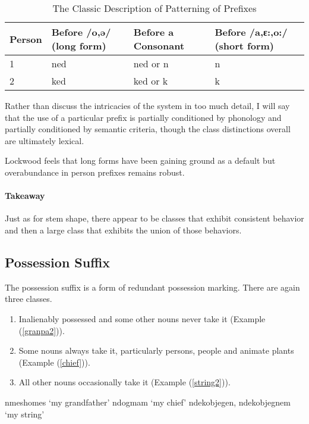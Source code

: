 \begin{table}[H]
\begin{center}
\begin{tabular}{lp{4cm}p{4cm}p{4cm}}
Person             & Before /o,ə/ (long form) & Before a Consonant & Before /a,ɛ:,o:/ (short form) \\
\hline
1                  & ned        & ned or n  & n            \\
2                  & ked        & ked or k  & k            \\
\end{tabular}
\caption{The Classic Description of Patterning of Prefixes}
\label{prefixes}
\end{center}
\end{table}

Rather than discuss the intricacies of the system in too much detail,
I will say that the use of a particular prefix is partially
conditioned by phonology and partially conditioned by semantic
criteria, though the class distinctions overall are ultimately
lexical.

Lockwood feels that long forms have been gaining ground as a default
but overabundance in person prefixes remains robust.

\paragraph{Takeaway} Just as for stem shape, there appear to be
classes that exhibit consistent behavior and then a large class that
exhibits the union of those behaviors.

\subsection{Possession Suffix}

The possession suffix is a form of redundant possession marking. There
are again three classes.

\begin{enumerate}
\item Inalienably possessed and some other nouns never take it
  (Example (\ref{granpa2})).
\item Some nouns always take it, particularly persons, people and
  animate plants (Example (\ref{chief})).
\item All other nouns occasionally take it (Example (\ref{string2})).
\end{enumerate}

\pex
\a\label{granpa2} nmeshomes `my grandfather'
\a\label{chief} ndogmam `my chief'
\a\label{string2} ndekobjegen, ndekobjegnem `my string'
\xe

